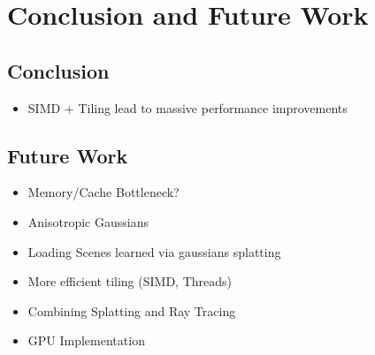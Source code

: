 \documentclass[a4paper, 11pt]{memoir}
\begin{document}

    \chapter{Conclusion and Future Work}
    \section{Conclusion}
    \begin{itemize}
        \item SIMD + Tiling lead to massive performance improvements
    \end{itemize}

    \section{Future Work}
    \begin{itemize}
        \item Memory/Cache Bottleneck?
        \item Anisotropic Gaussians
        \item Loading Scenes learned via gaussians splatting
        \item More efficient tiling (SIMD, Threads)
        \item Combining Splatting and Ray Tracing
        \item GPU Implementation
    \end{itemize}

    \appendix
\end{document}
